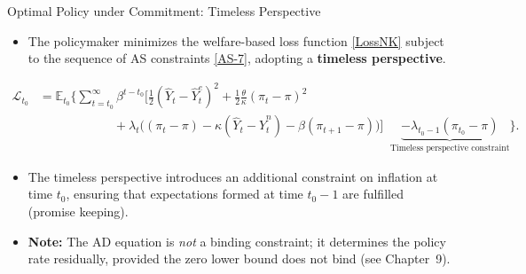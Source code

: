 \documentclass[11pt,aspectratio=169]{beamer}
\begin{document}
\begin{frame}{Optimal Policy under Commitment: Timeless Perspective}
\small

\begin{itemize}
  \item The policymaker minimizes the welfare-based loss function \eqref{LossNK}
  subject to the sequence of AS constraints \eqref{AS-7}, adopting a
  \textbf{timeless perspective}.
\end{itemize}

\begin{equation*}
\begin{aligned}
\mathcal{L}_{t_{0}} 
&= \mathbb{E}_{t_{0}} \Bigg\{ 
\sum_{t=t_{0}}^{\infty} \beta^{t-t_{0}}
\Bigg[
\frac{1}{2}\left( \hat{Y}_{t}-\hat{Y}_{t}^{e}\right)^{2}
+ \frac{1}{2}\frac{\theta}{\kappa}\left( \pi_{t}-\pi \right)^{2} \\
&\qquad\qquad\qquad
+ \lambda_{t}\Big( (\pi_{t}-\pi)
- \kappa(\hat{Y}_{t}-\hat{Y}_{t}^{n})
- \beta(\pi_{t+1}-\pi) \Big)
\Bigg]
\;\; \underbrace{- \lambda_{t_{0}-1}(\pi_{t_{0}}-\pi)}_{\text{Timeless perspective constraint}}
\Bigg\}.
\end{aligned}
\end{equation*}

\begin{itemize}
  \item The timeless perspective introduces an additional constraint on inflation at time $t_{0}$, ensuring that expectations formed at time $t_{0}-1$ are fulfilled (promise keeping).
  \item \textbf{Note:} The AD equation is \emph{not} a binding constraint; it determines the policy rate residually, provided the zero lower bound does not bind (see Chapter~9).
\end{itemize}

\end{frame}
\end{document}
